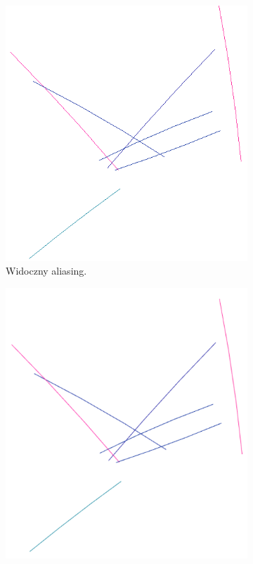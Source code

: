 \begin{figure}[H]
	\begin{subfigure}{0.45\textwidth}
		\centering
 		\includegraphics[width=\textwidth]{withAliasing.png}
    	\caption{Widoczny aliasing.}
 		\label{rys11}
	\end{subfigure}
	\hfill
	\begin{subfigure}{0.45\textwidth}
		\centering
		\includegraphics[width=\textwidth]{Antialiasing.png}

\end{subfigure}
\end{figure}
